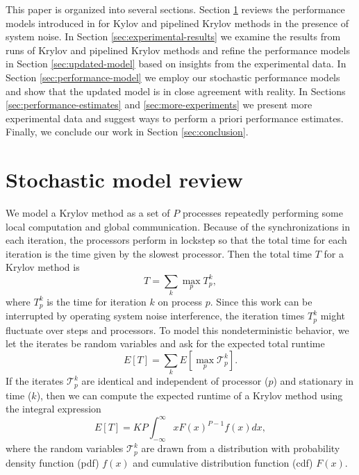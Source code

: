 \documentclass[sigconf, anonymous]{acmart}
\begin{document}
This paper is organized into several sections. Section \ref{sec:model-review} reviews the performance models introduced in \cite{morgan2016krylov} for Kylov and pipelined Krylov methods in the presence of system noise. In Section \ref{sec:experimental-results} we examine the results from runs of Krylov and pipelined Krylov methods and refine the performance models in Section \ref{sec:updated-model} based on insights from the experimental data.
In Section \ref{sec:performance-model} we employ our stochastic performance models and show that the updated model is in close agreement with reality.  In Sections \ref{sec:performance-estimates} and \ref{sec:more-experiments} we present more experimental data and suggest ways to perform a priori performance estimates.  Finally, we conclude our work in Section \ref{sec:conclusion}. 

\section{Stochastic model review} \label{sec:model-review}

We model a Krylov method as a set of $P$ processes repeatedly performing some local computation and global communication. Because of the synchronizations in each iteration, the processors perform in lockstep so that the total time for each iteration is the time given by the slowest processor. Then the total time $T$ for a Krylov method is
\begin{equation}
T = \sum_k \max_p T^k_p,
\end{equation}
where $T^k_p$ is the time for iteration $k$ on process $p$. Since this work can be interrupted by operating system noise interference, the iteration times $T^k_p$ might fluctuate over steps and processors. To model this nondeterministic behavior, we let the iterates be random variables and ask for the expected total runtime
\begin{equation}
E[T] = \sum_k E[ \max_p \mathcal{T}^k_p]. \label{eq:krylov-expression}
\end{equation}
If the iterates $\mathcal{T}^k_p$ are identical and independent of processor ($p$) and stationary in time ($k$), then we can compute the expected runtime of a Krylov method using the integral expression 
\begin{equation}
E[T] =  K P \int ^{\infty}_{-\infty} x F(x)^{P-1} f(x) dx \label{eq:krylov-model},
\end{equation}
where the random variables $\mathcal{T}^k_p$ are drawn from a distribution with probability density function (pdf) $f(x)$ and cumulative distribution function (cdf) $F(x)$. 
\end{document}
